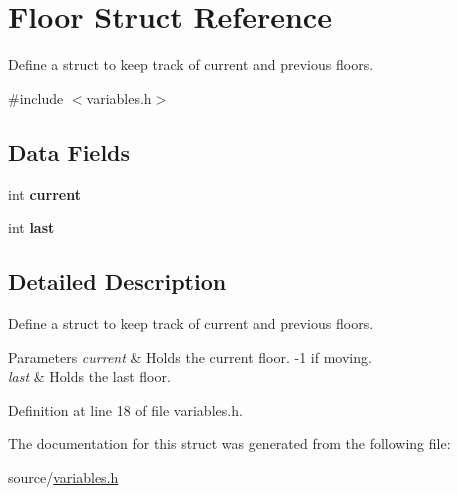 \hypertarget{structFloor}{}\section{Floor Struct Reference}
\label{structFloor}


Define a struct to keep track of current and previous floors.  




{\ttfamily \#include $<$variables.\+h$>$}

\subsection*{Data Fields}
\begin{DoxyCompactItemize}
\item 
\mbox{\label{structFloor_a5a00f2754bbc65702117716a5e7d87d4}} 
int {\bfseries current}
\item 
\mbox{\label{structFloor_ac90720369c3ed4f179214eede559224d}} 
int {\bfseries last}
\end{DoxyCompactItemize}


\subsection{Detailed Description}
Define a struct to keep track of current and previous floors. 


\begin{DoxyParams}{Parameters}
{\em current} & Holds the current floor. -\/1 if moving. \\
\hline
{\em last} & Holds the last floor. \\
\hline
\end{DoxyParams}


Definition at line 18 of file variables.\+h.



The documentation for this struct was generated from the following file\+:\begin{DoxyCompactItemize}
\item 
source/\hyperlink{variables_8h}{variables.\+h}\end{DoxyCompactItemize}
